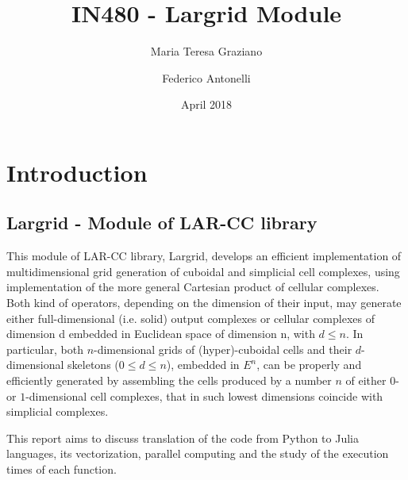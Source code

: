 \documentclass{article}
\title{IN480 - Largrid Module}
\author{Maria Teresa Graziano \and Federico Antonelli}
\date{April 2018}
\begin{document}
\maketitle

\tableofcontents
\section{Introduction}
\subsection{Largrid - Module of LAR-CC library}
This module of LAR-CC library, Largrid, develops an efficient implementation of multidimensional grid generation of cuboidal and simplicial cell complexes, using implementation of the more general Cartesian product of cellular complexes.
Both kind of operators, depending on the dimension of their input, may generate either full-dimensional (i.e. solid) output complexes or cellular complexes of dimension d embedded in Euclidean space of dimension n, with $d \leq n$. 
In particular, both $n$-dimensional grids of (hyper)-cuboidal cells and their $d$-dimensional skeletons ($0\leq d\leq n$), embedded in $E^n$, can be properly and efficiently generated by assembling the cells produced by a number $n$ of either $0$- or $1$-dimensional cell complexes, that in such lowest dimensions coincide with simplicial complexes\citep{largrid}.

This report aims to discuss translation of the code from Python to Julia languages, its vectorization, parallel computing and the study of the execution times of each function.
\end{document}
